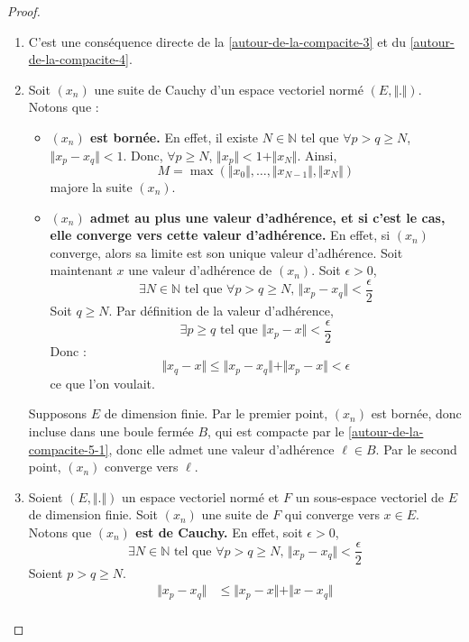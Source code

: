   \begin{proof}
    \begin{enumerate}[label=(\roman*)]
      \item C'est une conséquence directe de la \cref{autour-de-la-compacite-3} et du \cref{autour-de-la-compacite-4}.
      \item Soit $(x_n)$ une suite de Cauchy d'un espace vectoriel normé $(E, \Vert . \Vert)$. Notons que :
      \begin{itemize}
        \item \textbf{$(x_n)$ est bornée.} En effet, il existe $N \in \mathbb{N}$ tel que $\forall p > q \geq N$, $\Vert x_p - x_q \Vert < 1$. Donc, $\forall p \geq N$, $\Vert x_p \Vert < 1 + \Vert x_N \Vert$. Ainsi,
        \[ M = \max(\Vert x_0 \Vert, \dots, \Vert x_{N-1} \Vert, \Vert x_N \Vert) \]
        majore la suite $(x_n)$.
        \item \textbf{$(x_n)$ admet au plus une valeur d'adhérence, et si c'est le cas, elle converge vers cette valeur d'adhérence.} En effet, si $(x_n)$ converge, alors sa limite est son unique valeur d'adhérence. Soit maintenant $x$ une valeur d'adhérence de $(x_n)$. Soit $\epsilon > 0$,
        \[ \exists N \in \mathbb{N} \text{ tel que } \forall p > q \geq N, \, \Vert x_p - x_q \Vert < \frac{\epsilon}{2} \]
        Soit $q \geq N$. Par définition de la valeur d'adhérence,
        \[ \exists p \geq q \text{ tel que } \Vert x_p - x \Vert < \frac{\epsilon}{2} \]
        Donc :
        \[ \Vert x_q - x \Vert \leq \Vert x_p - x_q \Vert + \Vert x_p - x \Vert < \epsilon \]
        ce que l'on voulait.
      \end{itemize}
      Supposons $E$ de dimension finie. Par le premier point, $(x_n)$ est bornée, donc incluse dans une boule fermée $B$, qui est compacte par le \cref{autour-de-la-compacite-5-1}, donc elle admet une valeur d'adhérence $\ell \in B$. Par le second point, $(x_n)$ converge vers $\ell$.
      \item Soient $(E, \Vert . \Vert)$ un espace vectoriel normé et $F$ un sous-espace vectoriel de $E$ de dimension finie. Soit $(x_n)$ une suite de $F$ qui converge vers $x \in E$. Notons que \textbf{$(x_n)$ est de Cauchy.} En effet, soit $\epsilon > 0$,
      \[ \exists N \in \mathbb{N} \text{ tel que } \forall p > q \geq N, \, \Vert x_p - x_q \Vert < \frac{\epsilon}{2} \]
      Soient $p > q \geq N$.
      \begin{align*}
        \Vert x_p - x_q \Vert &\leq \Vert x_p - x \Vert + \Vert x - x_q \Vert \\

\end{align*}
\end{enumerate}
\end{proof}
